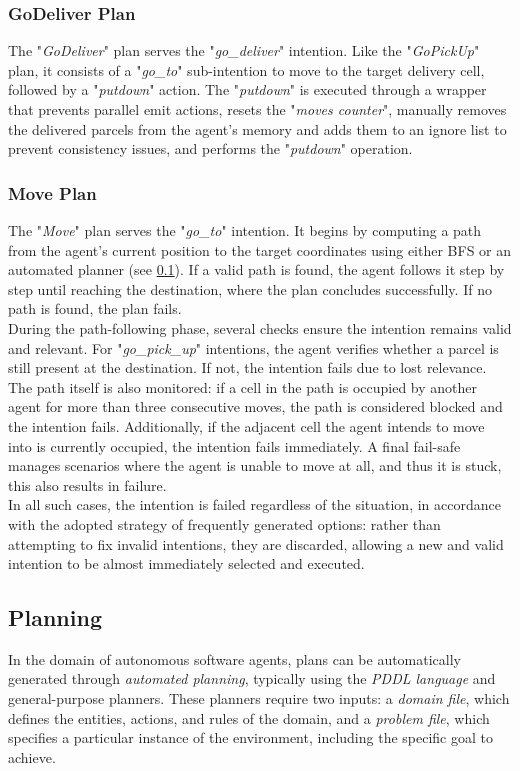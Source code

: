         \subsubsection{GoDeliver Plan}
            The "\textit{GoDeliver}" plan serves the "\textit{go\_deliver}" intention. Like the "\textit{GoPickUp}" plan, it consists of a "\textit{go\_to}" sub-intention to move to the target delivery cell, followed by a "\textit{putdown}" action. The "\textit{putdown}" is executed through a wrapper that prevents parallel emit actions, resets the "\textit{moves counter}", manually removes the delivered parcels from the agent's memory and adds them to an ignore list to prevent consistency issues, and performs the "\textit{putdown}" operation.

        \subsubsection{Move Plan}
            The "\textit{Move}" plan serves the "\textit{go\_to}" intention. It begins by computing a path from the agent's current position to the target coordinates using either BFS or an automated planner (see \ref{planning}). If a valid path is found, the agent follows it step by step until reaching the destination, where the plan concludes successfully. If no path is found, the plan fails.
            \medskip\\
            During the path-following phase, several checks ensure the intention remains valid and relevant. For "\textit{go\_pick\_up}" intentions, the agent verifies whether a parcel is still present at the destination. If not, the intention fails due to lost relevance. The path itself is also monitored: if a cell in the path is occupied by another agent for more than three consecutive moves, the path is considered blocked and the intention fails. Additionally, if the adjacent cell the agent intends to move into is currently occupied, the intention fails immediately. A final fail-safe manages scenarios where the agent is unable to move at all, and thus it is stuck, this also results in failure.
            \medskip\\
            In all such cases, the intention is failed regardless of the situation, in accordance with the adopted strategy of frequently generated options: rather than attempting to fix invalid intentions, they are discarded, allowing a new and valid intention to be almost immediately selected and executed.

    \subsection{Planning}\label{planning}
        In the domain of autonomous software agents, plans can be automatically generated through \textit{automated planning}, typically using the \textit{PDDL language} and general-purpose planners. These planners require two inputs: a \textit{domain file}, which defines the entities, actions, and rules of the domain, and a \textit{problem file}, which specifies a particular instance of the environment, including the specific goal to achieve.

